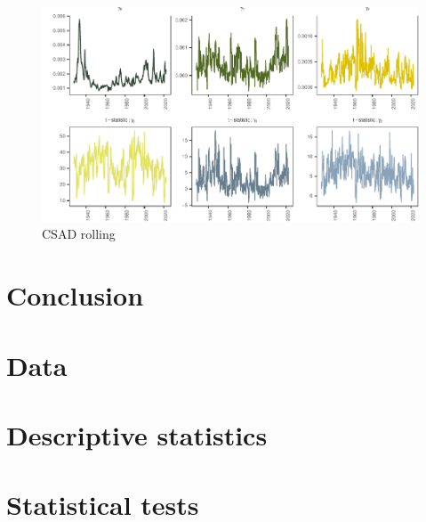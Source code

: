 \documentclass[
  12,
]{article}
\begin{document}
\begin{figure}
\centering
\includegraphics{1929_herding_files/figure-latex/rol-1.pdf}
\caption{\label{fig:rol}CSAD rolling}
\end{figure}

\newpage

\hypertarget{conclusion}{%
\section{Conclusion}\label{conclusion}}

\newpage

\renewcommand\refname{References}
  

\newpage
\begin{appendices}


\section{Data}



\section{Descriptive statistics}





\section{Statistical tests}

\end{appendices}
\end{document}

